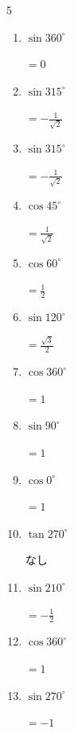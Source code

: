 \begin{multicols}{5}
\begin{enumerate}
  \item $\displaystyle \sin{360^\circ}$

        $\displaystyle =0$

  \item $\displaystyle \sin{315^\circ}$

        $\displaystyle =-\frac{1}{\sqrt{2}}$

  \item $\displaystyle \sin{315^\circ}$

        $\displaystyle =-\frac{1}{\sqrt{2}}$

  \item $\displaystyle \cos{45^\circ}$

        $\displaystyle =\frac{1}{\sqrt{2}}$

  \item $\displaystyle \cos{60^\circ}$

        $\displaystyle =\frac{1}{2}$

  \item $\displaystyle \sin{120^\circ}$

        $\displaystyle =\frac{\sqrt{3}}{2}$

  \item $\displaystyle \cos{360^\circ}$

        $\displaystyle =1$

  \item $\displaystyle \sin{90^\circ}$

        $\displaystyle =1$

  \item $\displaystyle \cos{0^\circ}$

        $\displaystyle =1$

\columnbreak %

  \item $\displaystyle \tan{270^\circ}$

        $\displaystyle なし$

  \item $\displaystyle \sin{210^\circ}$

        $\displaystyle =-\frac{1}{2}$

  \item $\displaystyle \cos{360^\circ}$

        $\displaystyle =1$

  \item $\displaystyle \sin{270^\circ}$

        $\displaystyle =-1$


\end{enumerate}
\end{multicols}

